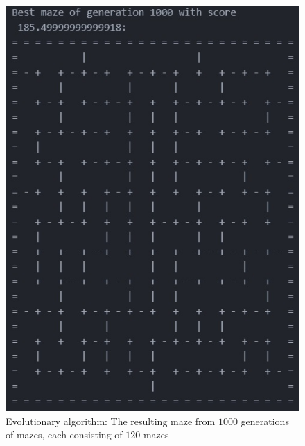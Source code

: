 \documentclass[10pt, a4paper, twoside]{amsart}
\newcommand{\1}{\mathbbm{1}}
\begin{document}
\begin{figure}
\centering
        \includegraphics[totalheight=8cm]{evolutional.jpg}
    \caption{Evolutionary algorithm: The resulting maze from $1000$ generations of mazes, each consisting of $120$ mazes}
\end{figure}
\end{document}
